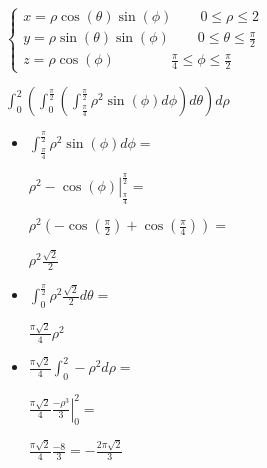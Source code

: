 \documentclass[../practica_09.tex]{subfiles}
\begin{document}
    $\left \{\begin{array}{ll}
        x = \rho\cos(\theta)\sin(\phi) \qquad 0 \leq \rho \leq 2\\
        y = \rho\sin(\theta)\sin(\phi) \qquad 0 \leq \theta \leq \frac{\pi}{2}\\
        z = \rho\cos(\phi) \qquad\qquad \frac{\pi}{4} \leq \phi \leq \frac{\pi}{2}
    \end{array} \right.$

    $\int_0^2 ( \int_0^{\frac{\pi}{2}} (\int_{\frac{\pi}{4}}^{\frac{\pi}{2}} \rho^2\sin(\phi) d\phi) d\theta ) d\rho$

    \begin{itemize}
        \item $\int_{\frac{\pi}{4}}^{\frac{\pi}{2}} \rho^2\sin(\phi) d\phi = $
        
            $ \left. \rho^2-\cos(\phi) \right |_{\frac{\pi}{4}}^{\frac{\pi}{2}} = $

            $ \rho^2 (-\cos(\frac{\pi}{2}) + \cos(\frac{\pi}{4})) = $

            $ \rho^2 \frac{\sqrt{2}}{2} $

        \item $\int_0^{\frac{\pi}{2}} \rho^2\frac{\sqrt{2}}{2} d\theta = $
        
            $ \frac{\pi\sqrt{2}}{4} \rho^2 $

        \item  $ \frac{\pi\sqrt{2}}{4} \int_0^2 -\rho^2 d\rho = $
        
            $ \frac{\pi\sqrt{2}}{4} \left. \frac{-\rho^3}{3} \right |_0^2 = $

            $ \frac{\pi\sqrt{2}}{4} \frac{-8}{3} = -\frac{2\pi\sqrt{2}}{3}$

    \end{itemize}
\end{document}
